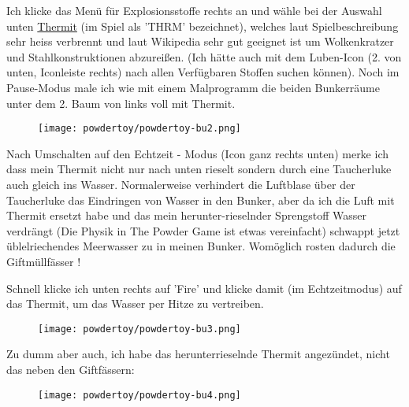 Ich klicke das Menü für Explosionsstoffe rechts an und wähle bei der Auswahl unten \href{https://de.wikipedia.org/wiki/Thermit}{Thermit} (im Spiel als 'THRM' bezeichnet), welches laut Spielbeschreibung sehr heiss verbrennt und laut Wikipedia sehr gut geeignet ist um Wolkenkratzer und Stahlkonstruktionen abzureißen. (Ich hätte auch mit dem Luben-Icon (2. von unten, Iconleiste rechts) nach allen Verfügbaren Stoffen suchen können). Noch im Pause-Modus male ich wie mit einem Malprogramm die beiden Bunkerräume unter dem 2. Baum von links voll mit Thermit.
\begin{figure}
\texttt{[image: powdertoy/powdertoy-bu2.png]}
\end{figure}
Nach Umschalten auf den Echtzeit - Modus (Icon ganz rechts unten) merke ich dass mein Thermit nicht nur nach unten rieselt sondern durch eine Taucherluke auch gleich ins Wasser. Normalerweise verhindert die Luftblase über der Taucherluke das Eindringen von Wasser in den Bunker, aber da ich die Luft mit Thermit ersetzt habe und das mein herunter-rieselnder Sprengstoff Wasser verdrängt (Die Physik in The Powder Game ist etwas vereinfacht) schwappt jetzt üblelriechendes Meerwasser zu in meinen Bunker. Womöglich rosten dadurch die Giftmüllfässer ! 

Schnell klicke ich unten rechts auf 'Fire' und klicke damit (im Echtzeitmodus) auf das Thermit, um das Wasser per Hitze zu vertreiben.
\begin{figure}
\texttt{[image: powdertoy/powdertoy-bu3.png]}
\end{figure}

Zu dumm aber auch, ich habe das herunterrieselnde Thermit angezündet, nicht das neben den Giftfässern:
\begin{figure}
\texttt{[image: powdertoy/powdertoy-bu4.png]}
\end{figure}

